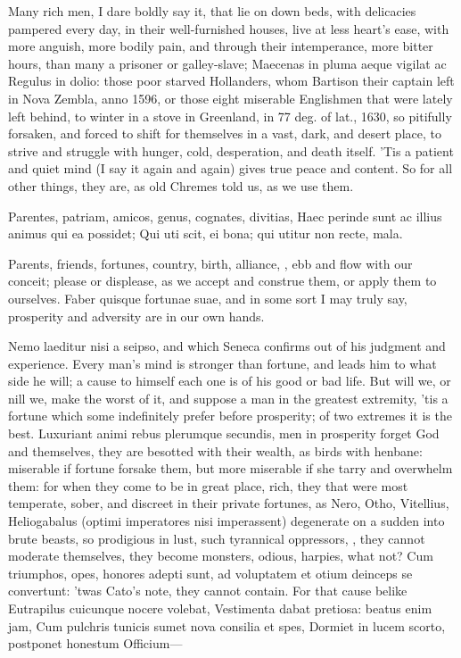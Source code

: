 {Many rich men, I dare boldly say it, that lie on down beds, with
delicacies pampered every day, in their well-furnished houses, live at
less heart's ease, with more anguish, more bodily pain, and through
their intemperance, more bitter hours, than many a prisoner or
galley-slave; Maecenas in pluma aeque vigilat ac Regulus in
dolio: those poor starved Hollanders, whom Bartison their captain
left in Nova Zembla, anno 1596, or those eight miserable
Englishmen that were lately left behind, to winter in a stove in
Greenland, in 77 deg. of lat., 1630, so pitifully forsaken, and forced
to shift for themselves in a vast, dark, and desert place, to strive
and struggle with hunger, cold, desperation, and death itself. 'Tis a
patient and quiet mind (I say it again and again) gives true peace and
content. So for all other things, they are, as old Chremes told
us, as we use them.

Parentes, patriam, amicos, genus, cognates, divitias,
Haec perinde sunt ac illius animus qui ea possidet;
Qui uti scit, ei bona; qui utitur non recte, mala.

Parents, friends, fortunes, country, birth, alliance, \etc{}, ebb and flow
with our conceit; please or displease, as we accept and construe them,
or apply them to ourselves. Faber quisque fortunae suae, and in some
sort I may truly say, prosperity and adversity are in our own hands.

Nemo laeditur nisi a seipso, and which Seneca confirms out of his
judgment and experience. Every man's mind is stronger than
fortune, and leads him to what side he will; a cause to himself each
one is of his good or bad life. But will we, or nill we, make the worst
of it, and suppose a man in the greatest extremity, 'tis a fortune
which some indefinitely prefer before prosperity; of two extremes it is
the best. Luxuriant animi rebus plerumque secundis, men in
prosperity forget God and themselves, they are besotted with
their wealth, as birds with henbane:  miserable if fortune
forsake them, but more miserable if she tarry and overwhelm them: for
when they come to be in great place, rich, they that were most
temperate, sober, and discreet in their private fortunes, as Nero,
Otho, Vitellius, Heliogabalus (optimi imperatores nisi imperassent)
degenerate on a sudden into brute beasts, so prodigious in lust, such
tyrannical oppressors, \etc{}, they cannot moderate themselves, they
become monsters, odious, harpies, what not? Cum triumphos, opes,
honores adepti sunt, ad voluptatem et otium deinceps se convertunt:
'twas Cato's note, they cannot contain. For that cause belike
Eutrapilus cuicunque nocere volebat,
Vestimenta dabat pretiosa: beatus enim jam,
Cum pulchris tunicis sumet nova consilia et spes,
Dormiet in lucem scorto, postponet honestum
Officium---

}
